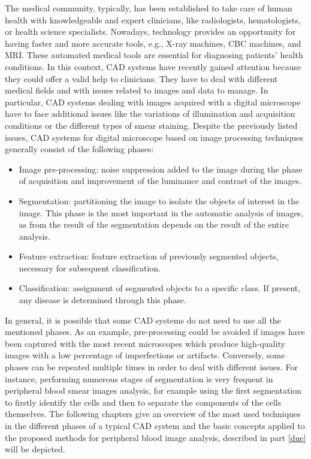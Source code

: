 The medical community, typically, has been established to take care of human health with knowledgeable and expert clinicians, like radiologists, hematologists, or health science specialists. Nowadays, technology provides an opportunity for having faster and more accurate tools, e.g., X-ray machines, CBC machines, and MRI. These automated medical tools are essential for diagnosing patients' health conditions. In this context, CAD systems have recently gained attention because they could offer a valid help to clinicians. They have to deal with different medical fields and with issues related to images and data to manage. In particular, CAD systems dealing with images acquired with a digital microscope have to face additional issues like the variations of illumination and acquisition conditions or the different types of smear staining. Despite the previously listed issues, CAD systems for digital microscope based on image processing techniques generally consist of the following phases:
\begin{itemize}
	\item Image pre-processing: noise suppression added to the image during the phase of acquisition and improvement of the luminance and contrast of the images.
	\item Segmentation: partitioning the image to isolate the objects of interest in the image. This phase is the most important in the automatic analysis of images, as from the result of the segmentation depends on the result of the entire analysis.
	\item Feature extraction: feature extraction of previously segmented objects, necessary for subsequent classification.
	\item Classification: assignment of segmented objects to a specific class. If present, any disease is determined through this phase.
\end{itemize}

In general, it is possible that some CAD systems do not need to use all the mentioned phases. As an example, pre-processing could be avoided if images have been captured with the most recent microscopes which produce high-quality images with a low percentage of imperfections or artifacts. Conversely, some phases can be repeated multiple times in order to deal with different issues. For instance, performing numerous stages of segmentation is very frequent in peripheral blood smear images analysis, for example using the first segmentation to firstly identify the cells and then to separate the components of the cells themselves. 
The following chapters give an overview of the most used techniques in the different phases of a typical CAD system and the basic concepts applied to the proposed methods for peripheral blood image analysis, described in part \ref{due} will be depicted.

